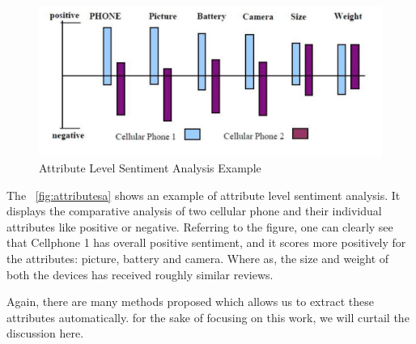 \begin{figure}[htb]
  \centering
  \includegraphics[width=130mm]{figures/2_attributesa}
  \caption[Sentiment Analysis - Attribute Level Example]{Attribute Level Sentiment Analysis Example }\label{fig:attributesa}
\end{figure}

The ~\autoref{fig:attributesa} shows an example of attribute level sentiment analysis. It displays the comparative analysis of two cellular phone and their individual attributes like positive or negative. Referring to the figure, one can clearly see that Cellphone 1 has overall positive sentiment, and it scores more positively for the attributes: picture, battery and camera. Where as, the size and weight of both the devices has received roughly similar reviews.

Again, there are many methods proposed which allows us to extract these attributes automatically. for the sake of focusing on this work, we will curtail the discussion here.  